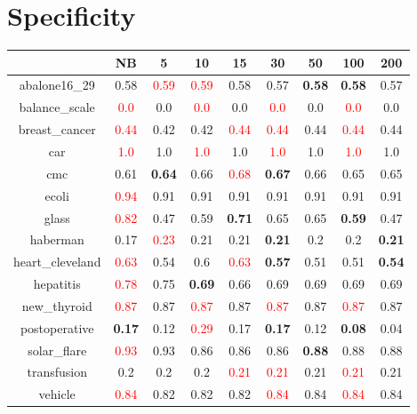 \documentclass{article}%
\begin{document}
\section*{Specificity}%
\begin{tabular}{c|cccccccc}%
\hline%
&NB&5&10&15&30&50&100&200\\%
\hline%
abalone16\_29&0.58&\textcolor{red}{ 
0.59
}&\textcolor{red}{ 
0.59
}&0.58&0.57&\textbf{0.58}&\textbf{0.58}&0.57\\%
\hline%
balance\_scale&\textcolor{red}{ 
0.0
}&0.0&\textcolor{red}{ 
0.0
}&0.0&\textcolor{red}{ 
0.0
}&0.0&\textcolor{red}{ 
0.0
}&0.0\\%
\hline%
breast\_cancer&\textcolor{red}{ 
0.44
}&0.42&0.42&\textcolor{red}{ 
0.44
}&\textcolor{red}{ 
0.44
}&0.44&\textcolor{red}{ 
0.44
}&0.44\\%
\hline%
car&\textcolor{red}{ 
1.0
}&1.0&\textcolor{red}{ 
1.0
}&1.0&\textcolor{red}{ 
1.0
}&1.0&\textcolor{red}{ 
1.0
}&1.0\\%
\hline%
cmc&0.61&\textbf{0.64}&0.66&\textcolor{red}{ 
0.68
}&\textbf{0.67}&0.66&0.65&0.65\\%
\hline%
ecoli&\textcolor{red}{ 
0.94
}&0.91&0.91&0.91&0.91&0.91&0.91&0.91\\%
\hline%
glass&\textcolor{red}{ 
0.82
}&0.47&0.59&\textbf{0.71}&0.65&0.65&\textbf{0.59}&0.47\\%
\hline%
haberman&0.17&\textcolor{red}{ 
0.23
}&0.21&0.21&\textbf{0.21}&0.2&0.2&\textbf{0.21}\\%
\hline%
heart\_cleveland&\textcolor{red}{ 
0.63
}&0.54&0.6&\textcolor{red}{ 
0.63
}&\textbf{0.57}&0.51&0.51&\textbf{0.54}\\%
\hline%
hepatitis&\textcolor{red}{ 
0.78
}&0.75&\textbf{0.69}&0.66&0.69&0.69&0.69&0.69\\%
\hline%
new\_thyroid&\textcolor{red}{ 
0.87
}&0.87&\textcolor{red}{ 
0.87
}&0.87&\textcolor{red}{ 
0.87
}&0.87&\textcolor{red}{ 
0.87
}&0.87\\%
\hline%
postoperative&\textbf{0.17}&0.12&\textcolor{red}{ 
0.29
}&0.17&\textbf{0.17}&0.12&\textbf{0.08}&0.04\\%
\hline%
solar\_flare&\textcolor{red}{ 
0.93
}&0.93&0.86&0.86&0.86&\textbf{0.88}&0.88&0.88\\%
\hline%
transfusion&0.2&0.2&0.2&\textcolor{red}{ 
0.21
}&\textcolor{red}{ 
0.21
}&0.21&\textcolor{red}{ 
0.21
}&0.21\\%
\hline%
vehicle&\textcolor{red}{ 
0.84
}&0.82&0.82&0.82&\textcolor{red}{ 
0.84
}&0.84&\textcolor{red}{ 
0.84
}&0.84\\%

\end{tabular}
\end{document}
